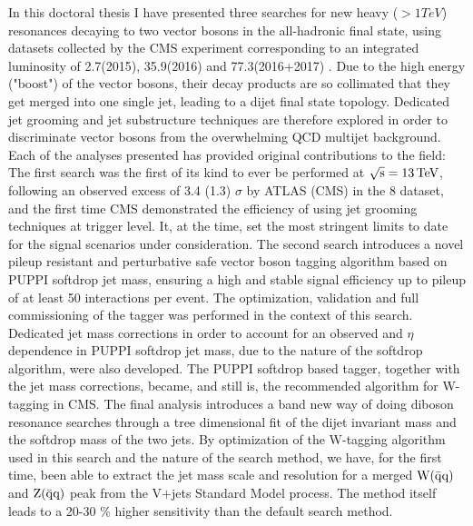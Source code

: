 \noindent In this doctoral thesis I have presented three searches for new heavy ($>1 TeV$) resonances decaying to two vector bosons in the all-hadronic final state, using datasets collected by the CMS experiment corresponding to an integrated luminosity of 2.7(2015), 35.9(2016) and 77.3(2016+2017) \fbinv. Due to the high energy ("boost") of the vector bosons, their decay products are so collimated that they get merged into one single jet, leading to a dijet final state topology.
Dedicated jet grooming and jet substructure techniques are therefore explored in order to discriminate vector bosons from the overwhelming QCD multijet background.
\newline 
\newline 
Each of the analyses presented has provided original contributions to the field: The first search was the first of its kind to ever be performed at $\sqrt{\rm{s}}=13 \,\text{Te\hspace{-.08em}V}$, following an observed excess of 3.4 (1.3) $\sigma$ by ATLAS (CMS) in the 8 \TeV dataset, and the first time CMS demonstrated the efficiency of using jet grooming techniques at trigger level. It, at the time, set the most stringent limits to date for the signal scenarios under consideration.\newline
The second search introduces a novel pileup resistant and perturbative safe vector boson tagging algorithm based on PUPPI softdrop jet mass, ensuring a high and stable signal efficiency up to pileup of at least 50 interactions per event. The optimization, validation and full commissioning of the tagger was performed in the context of this search. Dedicated jet mass corrections in order to account for an observed \PT and $\eta$ dependence in PUPPI softdrop jet mass, due to the nature of the softdrop algorithm, were also developed. The PUPPI softdrop based tagger, together with the jet mass corrections, became, and still is, the recommended algorithm for W-tagging in CMS. \newline
The final analysis introduces a band new way of doing diboson resonance searches through a tree dimensional fit of the dijet invariant mass and the softdrop mass of the two jets. By optimization of the W-tagging algorithm used in this search and the nature of the search method, we have, for the first time, been able to extract the jet mass scale and resolution for a merged  $\mathrm{W}(\bar{\rm{q}}\rm{q})$ and $\mathrm{Z}(\bar{\rm{q}}\rm{q})$ peak from the V+jets Standard Model process. The method itself leads to a 20-30 \% higher sensitivity than the default search method. 
\newline
